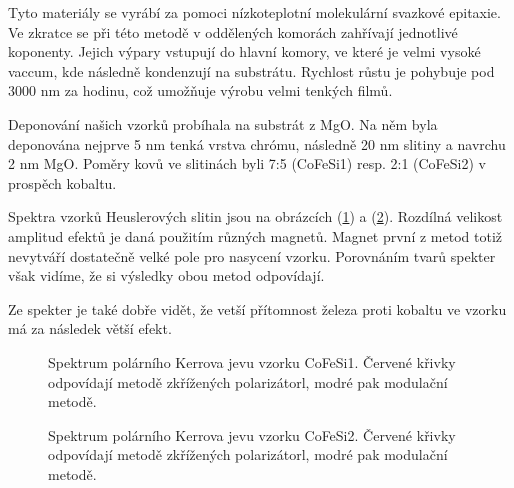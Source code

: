Tyto materiály se vyrábí za pomoci nízkoteplotní molekulární svazkové epitaxie. Ve zkratce se při této metodě v oddělených komorách zahřívají jednotlivé koponenty. Jejich výpary vstupují do hlavní komory, ve které je velmi vysoké vaccum, kde následně kondenzují na substrátu. Rychlost růstu je pohybuje pod 3000 nm za hodinu, což umožňuje výrobu velmi tenkých filmů.

Deponování našich vzorků probíhala na substrát z MgO. Na něm byla deponována nejprve 5 nm tenká vrstva chrómu, následně 20 nm slitiny a navrchu 2 nm MgO. Poměry kovů ve slitinách byli 7:5 (CoFeSi1) resp. 2:1 (CoFeSi2) v prospěch kobaltu.  

Spektra vzorků Heuslerových slitin jsou na obrázcích (\ref{sCoFeSi1}) a (\ref{sCoFeSi2}). Rozdílná velikost amplitud efektů je daná použitím různých magnetů. 
Magnet první z metod totiž nevytváří dostatečně velké pole pro nasycení vzorku. Porovnáním tvarů spekter však vidíme, že si výsledky obou metod odpovídají.

Ze spekter je také dobře vidět, že vetší přítomnost železa proti kobaltu ve vzorku má za následek větší efekt.

\begin{figure}

\caption{Spektrum polárního Kerrova jevu vzorku CoFeSi1. Červené křivky odpovídají metodě zkřížených polarizátorl, modré pak modulační metodě.}
\label{sCoFeSi1}
\end{figure}

\begin{figure}

\caption{Spektrum polárního Kerrova jevu vzorku CoFeSi2. Červené křivky odpovídají metodě zkřížených polarizátorl, modré pak modulační metodě.}
\label{sCoFeSi2}
\end{figure}
